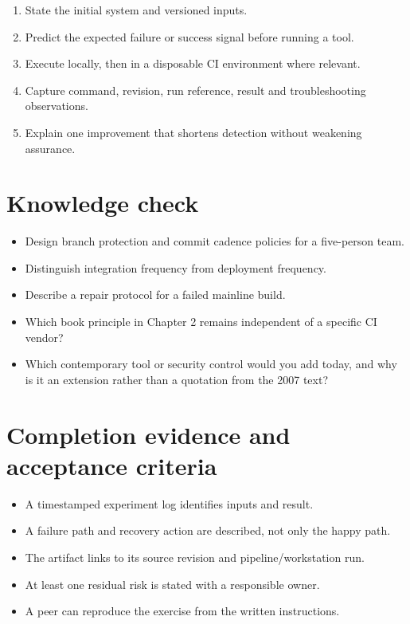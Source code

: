 \documentclass[11pt,letterpaper]{article}
\begin{document}
\begin{enumerate}
\item State the initial system and versioned inputs.
\item Predict the expected failure or success signal before running a tool.
\item Execute locally, then in a disposable CI environment where relevant.
\item Capture command, revision, run reference, result and troubleshooting observations.
\item Explain one improvement that shortens detection without weakening assurance.
\end{enumerate}
\section{Knowledge check}
\begin{itemize}
\item Design branch protection and commit cadence policies for a five-person team.
\item Distinguish integration frequency from deployment frequency.
\item Describe a repair protocol for a failed mainline build.
\item Which book principle in Chapter 2 remains independent of a specific CI vendor?
\item Which contemporary tool or security control would you add today, and why is it an extension rather than a quotation from the 2007 text?
\end{itemize}
\section{Completion evidence and acceptance criteria}
\begin{itemize}
\item A timestamped experiment log identifies inputs and result.
\item A failure path and recovery action are described, not only the happy path.
\item The artifact links to its source revision and pipeline/workstation run.
\item At least one residual risk is stated with a responsible owner.
\item A peer can reproduce the exercise from the written instructions.
\end{itemize}
\end{document}

